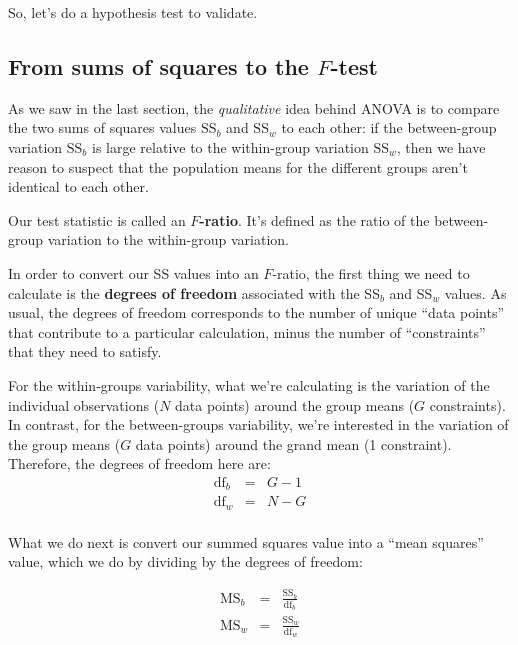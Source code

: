 \documentclass[
  11pt,
  a4paper,
  twoside,symmetric,openright]{book}
\theoremstyle{break}
\theoremstyle{break}
\begin{document}
So, let's do a hypothesis test to validate.

\subsection{\texorpdfstring{From sums of squares to the \(F\)-test}{From sums of squares to the F-test}}\label{from-sums-of-squares-to-the-f-test}

As we saw in the last section, the \emph{qualitative} idea behind ANOVA is to compare the two sums of squares values \(\mbox{SS}_ b\) and \(\mbox{SS}_ w\) to each other: if the between-group variation \(\mbox{SS}_ b\) is large relative to the within-group variation \(\mbox{SS}_ w\), then we have reason to suspect that the population means for the different groups aren't identical to each other.

Our test statistic is called an \textbf{\(F\)-ratio}. It's defined as the ratio of the between-group variation to the within-group variation.

In order to convert our SS values into an \(F\)-ratio, the first thing we need to calculate is the \textbf{degrees of freedom} associated with the SS\(_b\) and SS\(_w\) values. As usual, the degrees of freedom corresponds to the number of unique ``data points'' that contribute to a particular calculation, minus the number of ``constraints'' that they need to satisfy.

For the within-groups variability, what we're calculating is the variation of the individual observations (\(N\) data points) around the group means (\(G\) constraints). In contrast, for the between-groups variability, we're interested in the variation of the group means (\(G\) data points) around the grand mean (1 constraint). Therefore, the degrees of freedom here are:
\[
\begin{array}{lcl}
\mbox{df}_b &=& G-1 \\
\mbox{df}_w &=& N-G \\
\end{array}
\]

What we do next is convert our summed squares value into a ``mean squares'' value, which we do by dividing by the degrees of freedom:

\[
\begin{array}{lcl}
\mbox{MS}_b &=& \displaystyle\frac{\mbox{SS}_b }{ \mbox{df}_b} \\
\mbox{MS}_w &=& \displaystyle\frac{\mbox{SS}_w }{ \mbox{df}_w} 
\end{array}
\]
\end{document}
